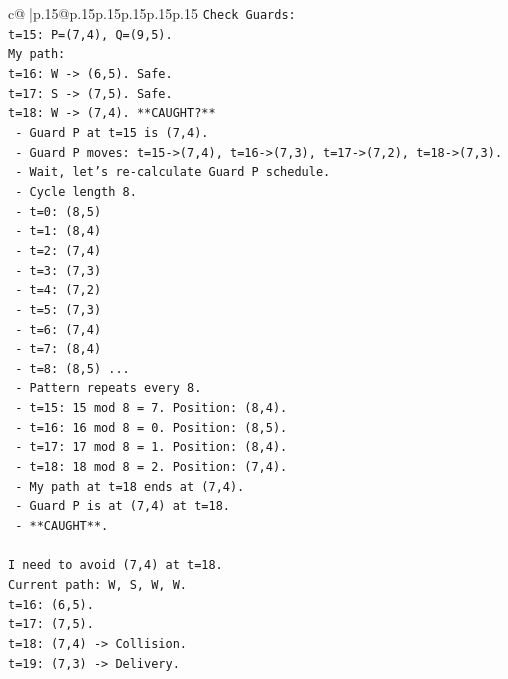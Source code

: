 \documentclass{article}
\begin{document}
{\begin{supertabular}{c@{$\;$}|p{.15\linewidth}@{}p{.15\linewidth}p{.15\linewidth}p{.15\linewidth}p{.15\linewidth}p{.15\linewidth}}
{{{\texttt{Check Guards:} \\
\texttt{t=15: P=(7,4), Q=(9,5).} \\
\texttt{My path:} \\
\texttt{t=16: W {-}> (6,5). Safe.} \\
\texttt{t=17: S {-}> (7,5). Safe.} \\
\texttt{t=18: W {-}> (7,4). **CAUGHT?**} \\
\texttt{  {-} Guard P at t=15 is (7,4).} \\
\texttt{  {-} Guard P moves: t=15{-}>(7,4), t=16{-}>(7,3), t=17{-}>(7,2), t=18{-}>(7,3).} \\
\texttt{  {-} Wait, let's re{-}calculate Guard P schedule.} \\
\texttt{  {-} Cycle length 8.} \\
\texttt{  {-} t=0: (8,5)} \\
\texttt{  {-} t=1: (8,4)} \\
\texttt{  {-} t=2: (7,4)} \\
\texttt{  {-} t=3: (7,3)} \\
\texttt{  {-} t=4: (7,2)} \\
\texttt{  {-} t=5: (7,3)} \\
\texttt{  {-} t=6: (7,4)} \\
\texttt{  {-} t=7: (8,4)} \\
\texttt{  {-} t=8: (8,5) ...} \\
\texttt{  {-} Pattern repeats every 8.} \\
\texttt{  {-} t=15: 15 mod 8 = 7. Position: (8,4).} \\
\texttt{  {-} t=16: 16 mod 8 = 0. Position: (8,5).} \\
\texttt{  {-} t=17: 17 mod 8 = 1. Position: (8,4).} \\
\texttt{  {-} t=18: 18 mod 8 = 2. Position: (7,4).} \\
\texttt{  {-} My path at t=18 ends at (7,4).} \\
\texttt{  {-} Guard P is at (7,4) at t=18.} \\
\texttt{  {-} **CAUGHT**.} \\
\\ 
\texttt{I need to avoid (7,4) at t=18.} \\
\texttt{Current path: W, S, W, W.} \\
\texttt{t=16: (6,5).} \\
\texttt{t=17: (7,5).} \\
\texttt{t=18: (7,4) {-}> Collision.} \\
\texttt{t=19: (7,3) {-}> Delivery.} \\
}}}
\end{supertabular}}
\end{document}
